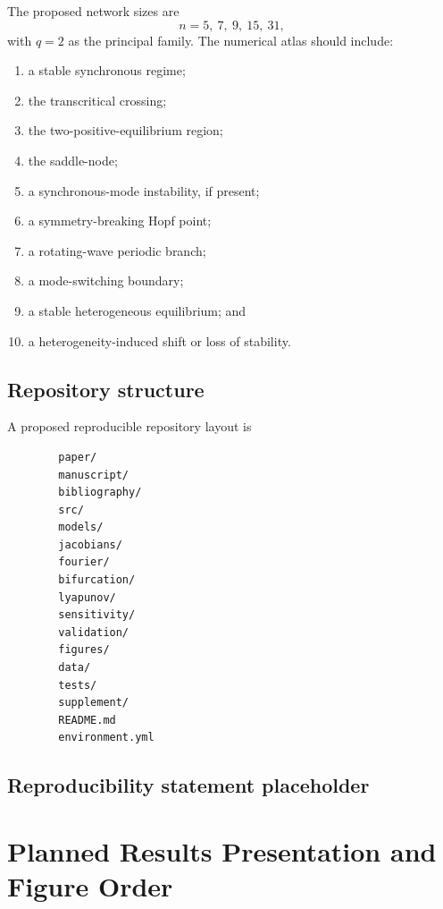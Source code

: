 \documentclass[11pt, reqno]{amsart}
\theoremstyle{definition}
\theoremstyle{remark}
\begin{document}
	The proposed network sizes are
	\[
	n=5,\ 7,\ 9,\ 15,\ 31,
	\]
	with $q=2$ as the principal family.  The numerical atlas should include:
	\begin{enumerate}[label=(\arabic*),leftmargin=2.5em]
		\item a stable synchronous regime;
		\item the transcritical crossing;
		\item the two-positive-equilibrium region;
		\item the saddle-node;
		\item a synchronous-mode instability, if present;
		\item a symmetry-breaking Hopf point;
		\item a rotating-wave periodic branch;
		\item a mode-switching boundary;
		\item a stable heterogeneous equilibrium; and
		\item a heterogeneity-induced shift or loss of stability.
	\end{enumerate}
	
	\subsection{Repository structure}
	
	A proposed reproducible repository layout is
	\begin{verbatim}
		paper/
		manuscript/
		bibliography/
		src/
		models/
		jacobians/
		fourier/
		bifurcation/
		lyapunov/
		sensitivity/
		validation/
		figures/
		data/
		tests/
		supplement/
		README.md
		environment.yml
	\end{verbatim}
	
	\subsection{Reproducibility statement placeholder}
	
	
	\section{Planned Results Presentation and Figure Order}
	\label{sec:planned-results}
	
\end{document}
